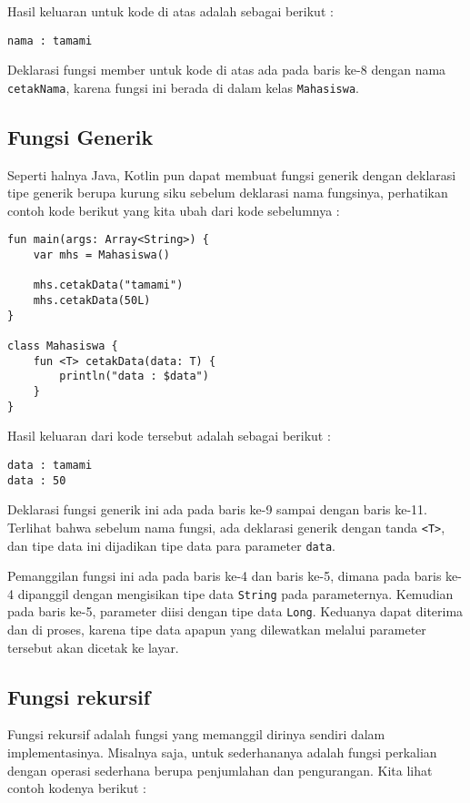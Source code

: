 Hasil keluaran untuk kode di atas adalah sebagai berikut :

\begin{lstlisting}
nama : tamami
\end{lstlisting}

Deklarasi fungsi member untuk kode di atas ada pada baris ke-8 dengan nama \texttt{cetakNama}, karena fungsi ini berada di dalam kelas \texttt{Mahasiswa}.

\subsection{Fungsi Generik}

Seperti halnya Java, Kotlin pun dapat membuat fungsi generik dengan deklarasi tipe generik berupa kurung siku sebelum deklarasi nama fungsinya, perhatikan contoh kode berikut yang kita ubah dari kode sebelumnya :

\begin{lstlisting}
fun main(args: Array<String>) {
	var mhs = Mahasiswa()
	
	mhs.cetakData("tamami")
	mhs.cetakData(50L)	
}

class Mahasiswa {
	fun <T> cetakData(data: T) {
		println("data : $data")
	}
}
\end{lstlisting}

Hasil keluaran dari kode tersebut adalah sebagai berikut :

\begin{lstlisting}
data : tamami
data : 50
\end{lstlisting}

Deklarasi fungsi generik ini ada pada baris ke-9 sampai dengan baris ke-11. Terlihat bahwa sebelum nama fungsi, ada deklarasi generik dengan tanda \texttt{<T>}, dan tipe data ini dijadikan tipe data para parameter \texttt{data}.

Pemanggilan fungsi ini ada pada baris ke-4 dan baris ke-5, dimana pada baris ke-4 dipanggil dengan mengisikan tipe data \texttt{String} pada parameternya. Kemudian pada baris ke-5, parameter diisi dengan tipe data \texttt{Long}. Keduanya dapat diterima dan di proses, karena tipe data apapun yang dilewatkan melalui parameter tersebut akan dicetak ke layar.

\subsection{Fungsi rekursif}

Fungsi rekursif adalah fungsi yang memanggil dirinya sendiri dalam implementasinya. Misalnya saja, untuk sederhananya adalah fungsi perkalian dengan operasi sederhana berupa penjumlahan dan pengurangan. Kita lihat contoh kodenya berikut :

